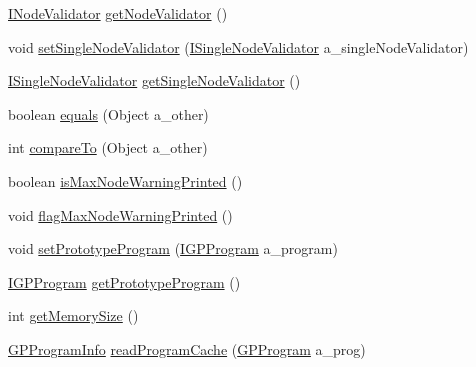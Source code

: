 \begin{DoxyCompactItemize}
\item 
\hyperlink{interfaceorg_1_1jgap_1_1gp_1_1_i_node_validator}{I\-Node\-Validator} \hyperlink{classorg_1_1jgap_1_1gp_1_1impl_1_1_g_p_configuration_abc4494312ed10634e36e31a2f620b4be}{get\-Node\-Validator} ()
\item 
void \hyperlink{classorg_1_1jgap_1_1gp_1_1impl_1_1_g_p_configuration_a2934dd393128ce7cb693515d7c6b6cd5}{set\-Single\-Node\-Validator} (\hyperlink{interfaceorg_1_1jgap_1_1gp_1_1_i_single_node_validator}{I\-Single\-Node\-Validator} a\-\_\-single\-Node\-Validator)
\item 
\hyperlink{interfaceorg_1_1jgap_1_1gp_1_1_i_single_node_validator}{I\-Single\-Node\-Validator} \hyperlink{classorg_1_1jgap_1_1gp_1_1impl_1_1_g_p_configuration_a3f86beac18e1fcdd7dab9aca6f3185cf}{get\-Single\-Node\-Validator} ()
\item 
boolean \hyperlink{classorg_1_1jgap_1_1gp_1_1impl_1_1_g_p_configuration_a233ef7ca13862a38268e4e9eaca65e14}{equals} (Object a\-\_\-other)
\item 
int \hyperlink{classorg_1_1jgap_1_1gp_1_1impl_1_1_g_p_configuration_ab05bf189f4a4efb78d1b5296f6a3bf82}{compare\-To} (Object a\-\_\-other)
\item 
boolean \hyperlink{classorg_1_1jgap_1_1gp_1_1impl_1_1_g_p_configuration_afb0fb8a3a64c979eae17da32abab01ef}{is\-Max\-Node\-Warning\-Printed} ()
\item 
void \hyperlink{classorg_1_1jgap_1_1gp_1_1impl_1_1_g_p_configuration_a7733eb21c8bb5a1e704557179e40a764}{flag\-Max\-Node\-Warning\-Printed} ()
\item 
void \hyperlink{classorg_1_1jgap_1_1gp_1_1impl_1_1_g_p_configuration_a1d0aa7f817d14ff1802896b3ebe6740e}{set\-Prototype\-Program} (\hyperlink{interfaceorg_1_1jgap_1_1gp_1_1_i_g_p_program}{I\-G\-P\-Program} a\-\_\-program)
\item 
\hyperlink{interfaceorg_1_1jgap_1_1gp_1_1_i_g_p_program}{I\-G\-P\-Program} \hyperlink{classorg_1_1jgap_1_1gp_1_1impl_1_1_g_p_configuration_a630a92b56e88a6e121320dae6075d83e}{get\-Prototype\-Program} ()
\item 
int \hyperlink{classorg_1_1jgap_1_1gp_1_1impl_1_1_g_p_configuration_ae307105ea7f8e296992549f331b2d8b4}{get\-Memory\-Size} ()
\item 
\hyperlink{classorg_1_1jgap_1_1gp_1_1impl_1_1_g_p_program_info}{G\-P\-Program\-Info} \hyperlink{classorg_1_1jgap_1_1gp_1_1impl_1_1_g_p_configuration_a0fee22d6a6e9c3addd7600d16062c656}{read\-Program\-Cache} (\hyperlink{classorg_1_1jgap_1_1gp_1_1impl_1_1_g_p_program}{G\-P\-Program} a\-\_\-prog)

\end{DoxyCompactItemize}
